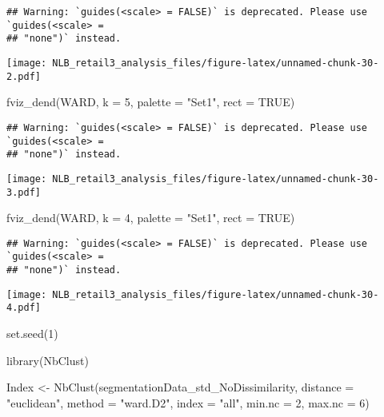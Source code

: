 \documentclass[
]{article}
\newenvironment{Shaded}{\begin{snugshade}}{\end{snugshade}}
\newcommand{\AttributeTok}[1]{\textcolor[rgb]{0.77,0.63,0.00}{#1}}
\newcommand{\ConstantTok}[1]{\textcolor[rgb]{0.00,0.00,0.00}{#1}}
\newcommand{\DecValTok}[1]{\textcolor[rgb]{0.00,0.00,0.81}{#1}}
\newcommand{\FunctionTok}[1]{\textcolor[rgb]{0.00,0.00,0.00}{#1}}
\newcommand{\NormalTok}[1]{#1}
\newcommand{\OtherTok}[1]{\textcolor[rgb]{0.56,0.35,0.01}{#1}}
\newcommand{\StringTok}[1]{\textcolor[rgb]{0.31,0.60,0.02}{#1}}
\begin{document}
\begin{verbatim}
## Warning: `guides(<scale> = FALSE)` is deprecated. Please use `guides(<scale> =
## "none")` instead.
\end{verbatim}

\texttt{[image: NLB\_retail3\_analysis\_files/figure-latex/unnamed-chunk-30-2.pdf]}

\begin{Shaded}
\begin{Highlighting}[]
\FunctionTok{fviz\_dend}\NormalTok{(WARD, }\AttributeTok{k =} \DecValTok{5}\NormalTok{, }\AttributeTok{palette =} \StringTok{"Set1"}\NormalTok{, }\AttributeTok{rect =} \ConstantTok{TRUE}\NormalTok{)}
\end{Highlighting}
\end{Shaded}

\begin{verbatim}
## Warning: `guides(<scale> = FALSE)` is deprecated. Please use `guides(<scale> =
## "none")` instead.
\end{verbatim}

\texttt{[image: NLB\_retail3\_analysis\_files/figure-latex/unnamed-chunk-30-3.pdf]}

\begin{Shaded}
\begin{Highlighting}[]
\FunctionTok{fviz\_dend}\NormalTok{(WARD, }\AttributeTok{k =} \DecValTok{4}\NormalTok{, }\AttributeTok{palette =} \StringTok{"Set1"}\NormalTok{, }\AttributeTok{rect =} \ConstantTok{TRUE}\NormalTok{)}
\end{Highlighting}
\end{Shaded}

\begin{verbatim}
## Warning: `guides(<scale> = FALSE)` is deprecated. Please use `guides(<scale> =
## "none")` instead.
\end{verbatim}

\texttt{[image: NLB\_retail3\_analysis\_files/figure-latex/unnamed-chunk-30-4.pdf]}

\begin{Shaded}
\begin{Highlighting}[]
\FunctionTok{set.seed}\NormalTok{(}\DecValTok{1}\NormalTok{)}

\FunctionTok{library}\NormalTok{(NbClust)}

\NormalTok{Index }\OtherTok{\textless{}{-}} \FunctionTok{NbClust}\NormalTok{(segmentationData\_std\_NoDissimilarity, }\AttributeTok{distance =} \StringTok{"euclidean"}\NormalTok{, }\AttributeTok{method =} \StringTok{"ward.D2"}\NormalTok{, }\AttributeTok{index =} \StringTok{"all"}\NormalTok{, }\AttributeTok{min.nc =} \DecValTok{2}\NormalTok{, }\AttributeTok{max.nc =} \DecValTok{6}\NormalTok{)}
\end{Highlighting}
\end{Shaded}
\end{document}

